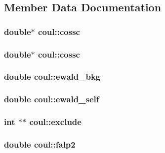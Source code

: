 \subsection{Member Data Documentation}
\subsubsection{\setlength{\rightskip}{0pt plus 5cm}double$\ast$ {\bf coul::cossc}}\label{structcoul_40463a0e5bd6f6d7b719127c037aa5ad}


\subsubsection{\setlength{\rightskip}{0pt plus 5cm}double$\ast$ {\bf coul::cossc}}\label{structcoul_40463a0e5bd6f6d7b719127c037aa5ad}


\subsubsection{\setlength{\rightskip}{0pt plus 5cm}double {\bf coul::ewald\_\-bkg}}\label{structcoul_d5b7fe9dece81a63373e95b521870548}


\subsubsection{\setlength{\rightskip}{0pt plus 5cm}double {\bf coul::ewald\_\-self}}\label{structcoul_c1cc3de4513e08f2fd6c91855ed71956}


\subsubsection{\setlength{\rightskip}{0pt plus 5cm}int $\ast$$\ast$ {\bf coul::exclude}}\label{structcoul_8c4063ff3c101107031eed1a06f49d4a}


\subsubsection{\setlength{\rightskip}{0pt plus 5cm}double {\bf coul::falp2}}\label{structcoul_f44d687a7af0bb56e17299e04c4c33ca}


